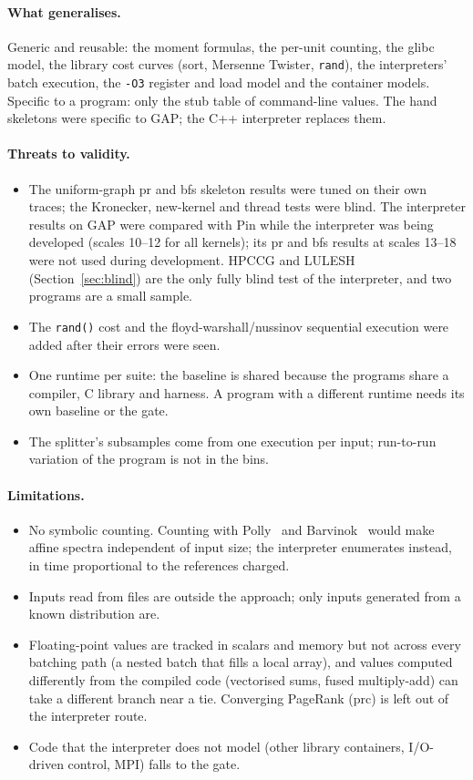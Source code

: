 \documentclass[11pt]{article}
\newcommand{\code}[1]{\texttt{#1}}
\newcommand{\secref}[1]{Section~\ref{#1}}
\begin{document}
\paragraph{What generalises.}
Generic and reusable: the moment formulas, the per-unit counting, the glibc model, the library cost curves (sort,
Mersenne Twister, \code{rand}), the interpreters' batch execution, the \code{-O3} register and load model and the
container models. Specific to a program: only the stub table of command-line values. The hand skeletons were specific
to GAP; the C++ interpreter replaces them.

\paragraph{Threats to validity.}
\begin{itemize}
\item The uniform-graph pr and bfs skeleton results were tuned on their own traces; the Kronecker, new-kernel and
thread tests were blind. The interpreter results on GAP were compared with Pin while the interpreter was being
developed (scales 10--12 for all kernels); its pr and bfs results at scales 13--18 were not used during development.
HPCCG and LULESH (\secref{sec:blind}) are the only fully blind test of the interpreter, and two programs are a small
sample.
\item The \code{rand()} cost and the floyd-warshall/nussinov sequential execution were added after their errors were
seen.
\item One runtime per suite: the baseline is shared because the programs share a compiler, C library and harness. A
program with a different runtime needs its own baseline or the gate.
\item The splitter's subsamples come from one execution per input; run-to-run variation of the program is not in
the bins.
\end{itemize}

\paragraph{Limitations.}
\begin{itemize}
\item No symbolic counting. Counting with Polly~\cite{grosser2012polly} and Barvinok~\cite{verdoolaege2007barvinok}
would make affine spectra independent of input size; the interpreter enumerates instead, in time proportional to the
references charged.
\item Inputs read from files are outside the approach; only inputs generated from a known distribution are.
\item Floating-point values are tracked in scalars and memory but not across every batching path (a nested batch that
fills a local array), and values computed differently from the compiled code (vectorised sums, fused multiply-add) can
take a different branch near a tie. Converging PageRank (prc) is left out of the interpreter route.
\item Code that the interpreter does not model (other library containers, I/O-driven control, MPI) falls to the gate.
\end{itemize}
\end{document}
